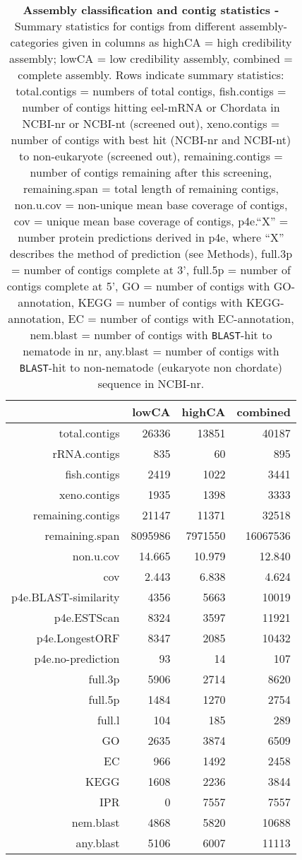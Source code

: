 \begin{table}[!h]
\begin{tabular}{rrrr}
  \hline
 & lowCA & highCA & combined \\ 
  \hline
total.contigs & 26336 & 13851 & 40187 \\ 
  rRNA.contigs & 835 & 60 & 895 \\ 
  fish.contigs & 2419 & 1022 & 3441 \\ 
  xeno.contigs & 1935 & 1398 & 3333 \\ 
  remaining.contigs & 21147 & 11371 & 32518 \\ 
  remaining.span & 8095986 & 7971550 & 16067536 \\ 
  non.u.cov & 14.665 & 10.979 & 12.840 \\ 
  cov & 2.443 & 6.838 & 4.624 \\ 
  p4e.BLAST-similarity & 4356 & 5663 & 10019 \\ 
  p4e.ESTScan & 8324 & 3597 & 11921 \\ 
  p4e.LongestORF & 8347 & 2085 & 10432 \\ 
  p4e.no-prediction & 93 & 14 & 107 \\ 
  full.3p & 5906 & 2714 & 8620 \\ 
  full.5p & 1484 & 1270 & 2754 \\ 
  full.l & 104 & 185 & 289 \\ 
  GO & 2635 & 3874 & 6509 \\ 
  EC & 966 & 1492 & 2458 \\ 
  KEGG & 1608 & 2236 & 3844 \\ 
  IPR & 0 & 7557 & 7557 \\ 
  nem.blast & 4868 & 5820 & 10688 \\ 
  any.blast & 5106 & 6007 & 11113 \\ 
   \hline
\end{tabular}
\caption[Assembly classification and contig
statistics]{\textbf{Assembly classification and contig statistics -}
  Summary statistics for contigs from different assembly-categories
  given in columns as highCA = high credibility assembly; lowCA = low
  credibility assembly, combined = complete assembly. Rows indicate
  summary statistics: total.contigs = numbers of total contigs,
  fish.contigs = number of contigs hitting eel-mRNA or Chordata in
  NCBI-nr or NCBI-nt (screened out), xeno.contigs = number of contigs
  with best hit (NCBI-nr and NCBI-nt) to non-eukaryote (screened out),
  remaining.contigs = number of contigs remaining after this
  screening, remaining.span = total length of remaining contigs,
  non.u.cov = non-unique mean base coverage of contigs, cov = unique
  mean base coverage of contigs, p4e.``X'' = number protein
  predictions derived in p4e, where ``X'' describes the method of
  prediction (see Methods), full.3p = number of contigs complete at
  3', full.5p = number of contigs complete at 5', GO = number of
  contigs with GO-annotation, KEGG = number of contigs with
  KEGG-annotation, EC = number of contigs with EC-annotation,
  nem.blast = number of contigs with \texttt{BLAST}-hit to nematode in
  nr, any.blast = number of contigs with \texttt{BLAST}-hit to
  non-nematode (eukaryote non chordate) sequence in NCBI-nr.}
\label{ass-stat}
\end{table}

